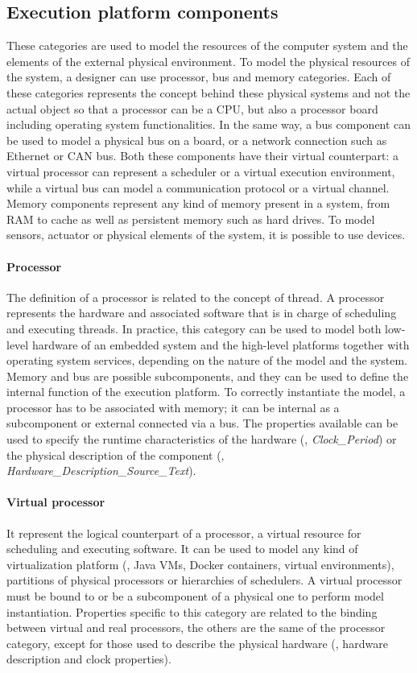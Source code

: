 \subsection{Execution platform components}
These categories are used to model the resources of the computer system and the elements of the external physical environment. To model the physical resources of the system, a designer can use processor,  bus and memory categories. Each of these categories represents the concept behind these physical systems and not the actual object so that a processor can be a CPU, but also a processor board including operating system functionalities. In the same way, a bus component can be used to model a physical bus on a board, or a network connection such as Ethernet or CAN bus. Both these components have their virtual counterpart: a virtual processor can represent a scheduler or a virtual execution environment, while a virtual bus can model a communication protocol or a virtual channel. Memory components represent any kind of memory present in a system, from RAM to cache as well as persistent memory such as hard drives. To model sensors, actuator or physical elements of the system, it is possible to use devices.

\paragraph{Processor} The definition of a processor is related to the concept of thread. A processor represents the hardware and associated software that is in charge of scheduling and executing threads. In practice, this category can be used to model both low-level hardware of an embedded system and the high-level platforms together with operating system services, depending on the nature of the model and the system. Memory and bus are possible subcomponents, and they can be used to define the internal function of the execution platform. To correctly instantiate the model, a processor has to be associated with memory; it can be internal as a subcomponent or external connected via a bus. The properties available can be used to specify the runtime characteristics of the hardware (\eg, \textit{Clock\_Period}) or the physical description of the component (\eg, \textit{Hardware\_Description\_Source\_Text}).

\paragraph{Virtual processor} It represent the logical counterpart of a processor, a virtual resource for scheduling and executing software. It can be used to model any kind of virtualization platform (\eg, Java VMs, Docker containers, virtual environments), partitions of physical processors or hierarchies of schedulers. A virtual processor must be bound to or be a subcomponent of a physical one to perform model instantiation. Properties specific to this category are related to the binding between virtual and real processors, the others are the same of the processor category, except for those used to describe the physical hardware (\eg, hardware description and clock properties).

